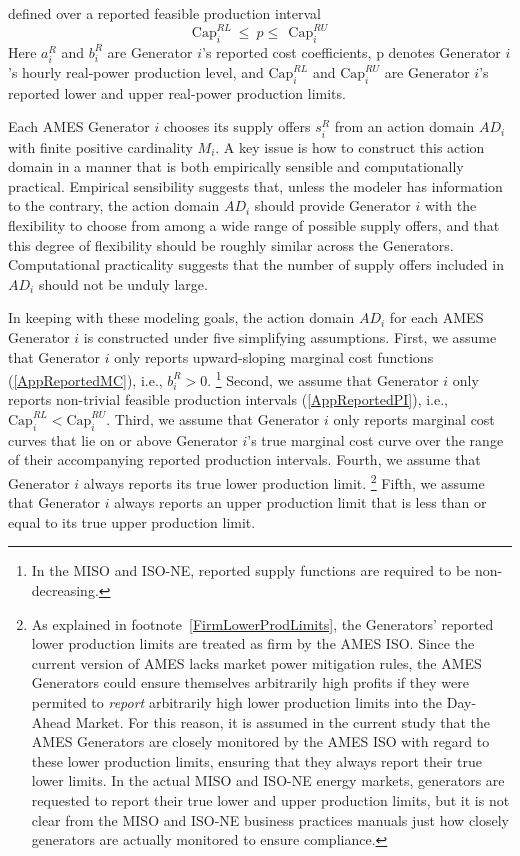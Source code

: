\documentclass[12pt]{article}
\begin{document}
\smallskip
\noindent
defined over a reported feasible production interval
          \begin{equation}  \label{AppReportedPI}
     \mbox{Cap}^{RL}_i ~\le  ~ p \le ~~ \mbox{Cap}^{RU}_i
          \end{equation}
Here $a^R_i$ and $b^R_i$ are Generator $i$'s reported cost coefficients, p denotes Generator $i$'s hourly real-power production level, and $\mbox{Cap}^{RL}_i$ and $\mbox{Cap}^{RU}_i$ are Generator $i$'s reported lower and upper real-power production limits.

Each AMES Generator $i$ chooses its supply offers $s^R_i$ from an action domain $AD_i$ with finite positive cardinality
$M_i$.  A key issue is how to construct this action domain in a manner that is both empirically sensible and computationally practical.  Empirical sensibility suggests that, unless the modeler has information to the contrary, the action domain $AD_i$ should provide Generator $i$ with the flexibility to choose from among a wide range of possible supply offers, and that this degree of flexibility should be roughly similar across the Generators.  Computational practicality suggests that the number of  supply offers included in $AD_i$ should not be unduly large.

In keeping with these modeling goals, the action domain $AD_i$ for each AMES Generator $i$ is constructed under 
five simplifying assumptions. 
       First, we assume that Generator $i$ only reports upward-sloping marginal cost functions (\ref{AppReportedMC}),
i.e., $b^R_i > 0$.%
         \footnote{In the MISO and ISO-NE, reported supply functions are required to be non-decreasing.}  
     Second, we assume that Generator $i$ only reports non-trivial feasible production intervals (\ref{AppReportedPI}), i.e., $\mbox{Cap}^{RL}_i  <  \mbox{Cap}^{RU}_i$.     
     Third, we assume that Generator $i$ only reports marginal cost curves that lie on or above Generator $i$'s true marginal cost curve over the range of their accompanying reported production intervals. 
       Fourth, we assume that Generator $i$ always reports its true lower production limit.%
    \footnote{As explained in footnote~\ref{FirmLowerProdLimits}, the Generators' reported lower production limits are treated as firm by the AMES ISO.  Since the current version of AMES lacks market power mitigation rules, the AMES Generators could ensure themselves arbitrarily high profits if they were permited to \textit{report\/} arbitrarily high lower production limits into the Day-Ahead Market. For this reason, it is assumed in the current study that the AMES Generators are closely monitored by the AMES ISO with regard to these lower production limits, ensuring that they always report their true lower limits. In the actual MISO and ISO-NE energy markets, generators are requested to report their true lower and upper production limits, but it is not clear from the MISO and ISO-NE business practices manuals just how closely generators are actually monitored to ensure compliance.\label{ProdLimCompliance}}
    Fifth, we assume that Generator $i$ always reports an upper production limit that is less than or equal to its true upper production limit.     
\end{document}
